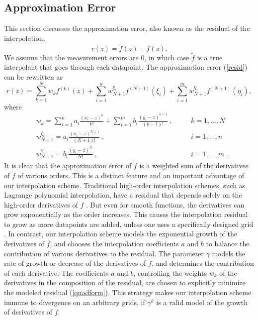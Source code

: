 \subsection{Approximation Error}
This section discusses the approximation error, also known as the residual of
the interpolation,
\[ r(z) = {\tilde f}(z) - f(z) . \]
We assume that the measurement errors are 0, in which case $\tilde f$ is a
true interpolant that goes through each datapoint.  The approximation error
(\ref{resid}) can be rewritten as
\[ r(z) = \sum_{k=1}^N w_k f^{(k)}(z)
      + \sum_{i=1}^n w_{N+1}^{\xi_i} f^{(N+1)}(\xi_i)
      + \sum_{i=1}^m w_{N+1}^{\eta_i} f^{(N+1)}(\eta_i) ,
\]
where
\[\begin{aligned}
  & w_k = \sum_{i=1}^n a_i \frac{(x_i - z)^k}{k!} +
         \sum_{i=1}^m b_i \frac{(y_i - z)^{k-1}}{(k-1)!} \;,
  && \quad k = 1,\ldots, N \\
  & w_{N+1}^{\xi_i} = a_i \frac{(x_i - z)^{N+1}}{(N+1)!} \;,
  && \quad i = 1,\ldots,n \\
  & w_{N+1}^{\eta_i} = b_i \frac{(y_i - z)^N}{N!} \;,
  && \quad i = 1,\ldots,m \;.
\end{aligned} \]
It is clear that the approximation error of $\tilde f$ is a weighted sum of the
derivatives of $f$ of various orders.  This is a distinct feature and an
important advantage of our interpolation scheme.  Traditional high-order
interpolation schemes, such as Lagrange polynomial interpolation, have
a residual that depends solely on the high-order derivatives of $f$
\cite[]{polyinterp}.  But even for smooth
functions, the derivatives can grow exponentially as the order increases.
This causes the interpolation residual to grow as more datapoints are added,
unless one uses a specifically designed grid \cite[]{runge}.
In contrast, our interpolation scheme
models the exponential growth of the derivatives of $f$, and chooses the
interpolation coefficients $a$ and $b$ to balance the contribution of various
derivatives to the residual.  The parameter $\gamma$ models the rate of
growth or decrease of the derivatives of $f$, and determines
the contribution of each derivative.
The coefficients $a$ and $b$, controlling the weights $w_k$
of the derivatives in the composition of the residual, are chosen
to explicitly minimize
the modeled residual (\ref{quadform}).  This strategy makes our interpolation
scheme immune to divergence on an arbitrary grids, if $\gamma^k$ is a 
valid model of the growth of derivatives of $f$.

